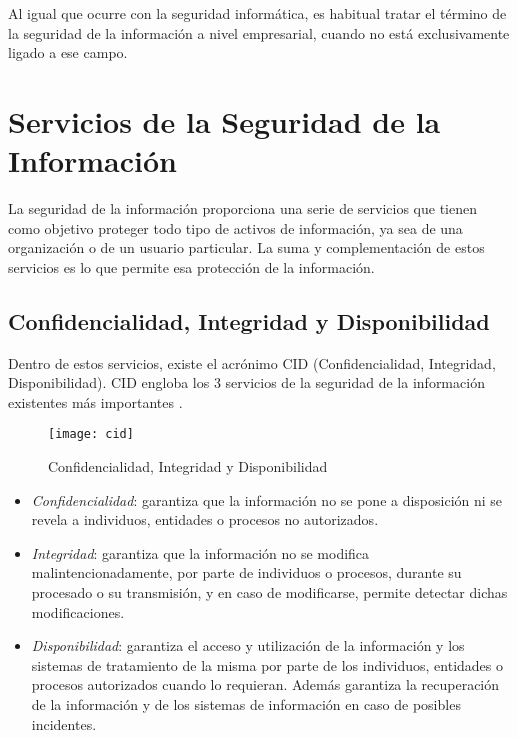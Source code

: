 Al igual que ocurre con la seguridad informática, es habitual tratar el término de la seguridad de la información a nivel empresarial, cuando no está exclusivamente ligado a ese campo.


\section{Servicios de la Seguridad de la Información}
La seguridad de la información proporciona una serie de servicios que tienen como objetivo proteger todo tipo de activos de información, ya sea de una organización o de un usuario particular. La suma y complementación de estos servicios es lo que permite esa protección de la información.

\subsection[CID]{Confidencialidad, Integridad y Disponibilidad}

Dentro de estos servicios, existe el acrónimo CID (Confidencialidad, Integridad, Disponibilidad). CID engloba los 3 servicios de la seguridad de la información existentes más importantes \cite{iso-27000}.

\begin{figure}[H]
	\centering
	\texttt{[image: cid]}
	\caption{Confidencialidad, Integridad y Disponibilidad}
	\label{fig:cid}
\end{figure}

\begin{itemize}
	\item \emph{Confidencialidad}: garantiza que la información no se pone a disposición ni se revela  a individuos, entidades o procesos no autorizados.
	\item \emph{Integridad}: garantiza que la información no se modifica malintencionadamente, por parte de individuos o procesos, durante su procesado o su transmisión, y en caso de modificarse, permite detectar dichas modificaciones.
	\item \emph{Disponibilidad}: garantiza el acceso y utilización de la información y los sistemas de tratamiento de la misma por parte de los individuos, entidades o procesos autorizados cuando lo requieran. Además garantiza la recuperación de la información y de los sistemas de información en caso de posibles incidentes.
\end{itemize}

